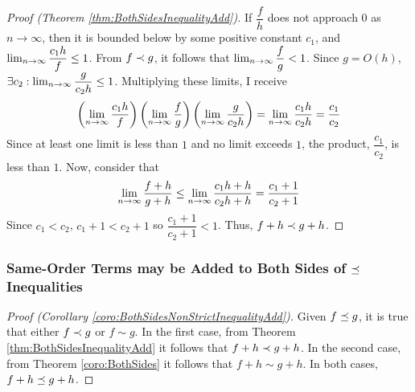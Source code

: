 \begin{proof}[Proof (Theorem \ref{thm:BothSidesInequalityAdd})]
	If $\dfrac{f}{h}$ does not approach $0$ as $n \to \infty$, then it is bounded below by some positive constant $c_1$, and $\lim_{n \to \infty} \dfrac{c_1 h}{f} \leq 1$. From $f \prec g$, it follows that $\lim_{n \to \infty} \dfrac{f}{g} < 1$. Since $g = O(h)$, $\exists c_2 : \lim_{n \to \infty} \dfrac{g}{c_2 h} \leq 1$. Multiplying these limits, I receive
	\begin{align*}
	\left( \lim_{n \to \infty} \frac{c_1 h}{f} \right) \left( \lim_{n \to \infty} \dfrac{f}{g} \right) \left( \lim_{n \to \infty} \dfrac{g}{c_2 h} \right) = \lim_{n \to \infty} \frac{c_1 h}{c_2 h} = \frac{c_1}{c_2}
	\end{align*}
	Since at least one limit is less than $1$ and no limit exceeds $1$, the product, $\dfrac{c_1}{c_2}$, is less than $1$. Now, consider that
	\begin{align*}
	\lim_{n \to \infty} \frac{f + h}{g + h} \leq \lim_{n \to \infty} \frac{c_1 h + h}{c_2 h + h} = \frac{c_1 + 1}{c_2 + 1}
	\end{align*}
	Since $c_1 < c_2$, $c_1 + 1 < c_2 + 1$ so $\dfrac{c_1 + 1}{c_2 + 1} < 1$. Thus, $f + h \prec g + h$.
\end{proof}

\subsubsection{Same-Order Terms may be Added to Both Sides of $\preceq$ Inequalities}

\begin{proof}[Proof (Corollary \ref{coro:BothSidesNonStrictInequalityAdd})]
	Given $f \preceq g$, it is true that either $f \prec g$ or $f \sim g$. In the first case, from Theorem \ref{thm:BothSidesInequalityAdd} it follows that $f + h \prec g + h$. In the second case, from Theorem \ref{coro:BothSides} it follows that $f + h \sim g + h$. In both cases, $f + h \preceq g + h$.
\end{proof}